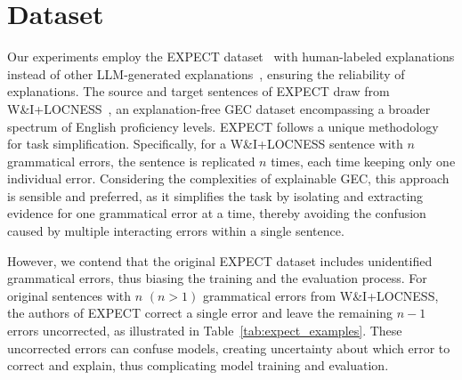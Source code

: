 


\section{\Dataset{} Dataset}
\label{sec:dataset}
Our experiments employ the EXPECT dataset~\citep{fei-etal-2023-enhancing} with human-labeled explanations instead of other LLM-generated explanations~\citep{song-etal-2024-gee}, ensuring the reliability of explanations. The source and target sentences of EXPECT draw from W\&I+LOCNESS~\citep{bryant-etal-2019-bea}, an explanation-free GEC dataset encompassing a broader spectrum of English proficiency levels. EXPECT follows a unique methodology for task simplification. Specifically, for a W\&I+LOCNESS sentence with $n$ grammatical errors, the sentence is replicated $n$ times, each time keeping only one individual error. Considering the complexities of explainable GEC, this approach is sensible and preferred, as it simplifies the task by isolating and extracting evidence for one grammatical error at a time, thereby avoiding the confusion caused by multiple interacting errors within a single sentence.

However, we contend that the original EXPECT dataset includes unidentified grammatical errors, thus biasing the training and the evaluation process. For original sentences with $n$ $(n>1)$ grammatical errors from W\&I+LOCNESS, the authors of EXPECT correct a single error and leave the remaining $n-1$ errors uncorrected, as illustrated in Table~\ref{tab:expect_examples}. These uncorrected errors can confuse models, creating uncertainty about which error to correct and explain, thus complicating model training and evaluation.




